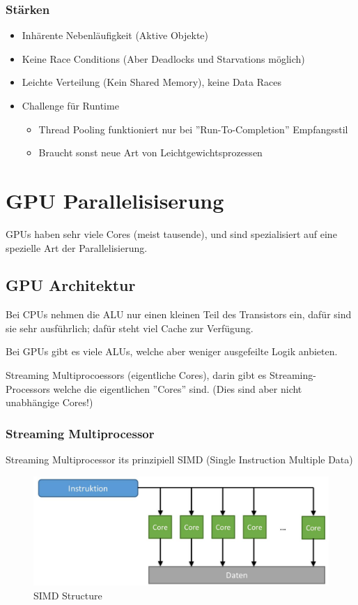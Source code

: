 \subsubsection{Stärken}

\begin{itemize}
	\item Inhärente Nebenläufigkeit (Aktive Objekte)
	\item Keine Race Conditions (Aber Deadlocks und Starvations möglich)
	\item Leichte Verteilung (Kein Shared Memory), keine Data Races
	\item Challenge für Runtime \begin{itemize}
		\item Thread Pooling funktioniert nur bei ''Run-To-Completion'' Empfangsstil
		\item Braucht sonst neue  Art von Leichtgewichtsprozessen
	\end{itemize}
\end{itemize}


\section{GPU Parallelisiserung}

GPUs haben sehr viele Cores (meist tausende), und sind spezialisiert auf eine spezielle Art der Parallelisierung.


\subsection{GPU Architektur}

Bei CPUs nehmen die ALU nur einen kleinen Teil des Transistors ein, dafür sind sie sehr ausführlich; dafür steht viel Cache zur Verfügung.

Bei GPUs gibt es viele ALUs, welche aber weniger ausgefeilte Logik anbieten.

Streaming Multiprocoessors (eigentliche Cores), darin gibt es Streaming-Processors welche die eigentlichen ''Cores'' sind. (Dies sind aber nicht unabhängige Cores!)

\subsubsection{Streaming Multiprocessor}

Streaming Multiprocessor its prinzipiell SIMD (Single Instruction Multiple Data)
\begin{figure}[h]
	\centering
	\includegraphics[width=0.7\linewidth]{img/simd_structure}
	\caption{SIMD Structure}
	\label{fig:simdstructure}
\end{figure}


